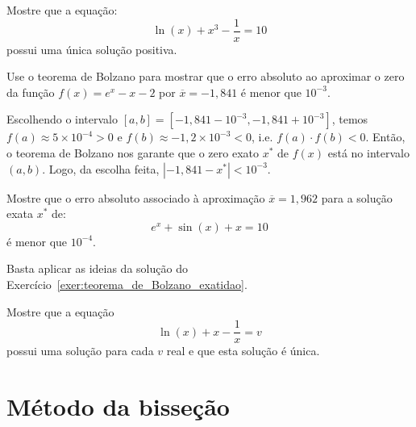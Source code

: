 \begin{Exercise}Mostre que a equação:
  \begin{equation*}
    \ln(x)+x^3-\frac{1}{x}=10  
  \end{equation*}
possui uma única solução positiva.
\end{Exercise}

\begin{Exercise}\label{exer:teorema_de_Bolzano_exatidao} Use o teorema de Bolzano para mostrar que o erro absoluto ao aproximar o zero da função $f(x)=e^x-x-2$ por $\overline{x}=-1,841$ é menor que $10^{-3}$.
\end{Exercise}
\begin{Answer}
  \begin{tiny}
    Escolhendo o intervalo $[a, b] = [-1,841-10^{-3}, -1,841+10^{-3}]$, temos $f(a)\approx 5\times 10^{-4} > 0$ e $f(b)\approx -1,2\times 10^{-3} < 0$, i.e. $f(a)\cdot f(b) < 0$. Então, o teorema de Bolzano nos garante que o zero exato $x^*$ de $f(x)$ está no intervalo $(a, b)$. Logo, da escolha feita, $|-1,841 - x^*| < 10^{-3}$.
  \end{tiny}
\end{Answer}

\begin{Exercise} Mostre que o erro absoluto associado à aproximação $\overline{x} = 1,962$ para a solução exata $x^*$ de:
  \begin{equation*}
    e^x+\sin (x) +x = 10  
  \end{equation*}
é menor que $10^{-4}$.
\end{Exercise}
\begin{Answer}
  Basta aplicar as ideias da solução do Exercício~\ref{exer:teorema_de_Bolzano_exatidao}.
\end{Answer}

\begin{Exercise}\label{existe_unica} Mostre que a equação
  \begin{equation*}
    \ln(x)+x-\frac{1}{x}=v
  \end{equation*}
possui uma solução para cada $v$ real e que esta solução é única.
\end{Exercise}


\section{Método da bisseção}

